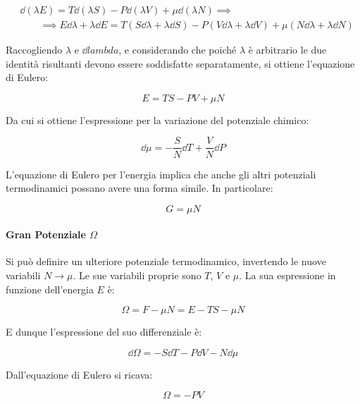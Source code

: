 \begin{align*}
& \dd (\lambda E) = T \dd (\lambda S) - P \dd (\lambda V) + \mu \dd (\lambda N) \implies\\ 
& \qquad \implies E \dd \lambda + \lambda \dd E  = T (S \dd \lambda + \lambda \dd S) - P (V \dd \lambda + \lambda \dd V) + \mu (N\dd \lambda + \lambda \dd N)
\end{align*}

Raccogliendo $\lambda$ e $\dd lambda$, e considerando che poiché $\lambda$ è arbitrario le due identità risultanti devono essere soddisfatte separatamente, si ottiene l'equazione di Eulero:

\begin{equation*}
E = TS - PV + \mu N
\end{equation*}

Da cui si ottiene l'espressione per la variazione del potenziale chimico:

\begin{equation*}
\dd \mu = - \frac{S}{N} \dd T + \frac{V}{N} \dd P
\end{equation*}

L'equazione di Eulero per l'energia implica che anche gli altri potenziali termodinamici possano avere una forma simile. In particolare:

\begin{equation*}
G = \mu N
\end{equation*}

\paragraph{Gran Potenziale $\Omega$} Si può definire un ulteriore potenziale termodinamico, invertendo le nuove variabili $N \rightarrow \mu$. Le sue variabili proprie sono $T$, $V$ e $\mu$. La sua espressione in funzione dell'energia $E$ è:

\begin{equation*}
\Omega = F - \mu N = E - TS - \mu N
\end{equation*}

E dunque l'espressione del suo differenziale è:

\begin{equation*}
\dd \Omega = - S \dd T - P \dd V - N \dd \mu
\end{equation*}

Dall'equazione di Eulero si ricava:

\begin{equation*}
\Omega = - P V
\end{equation*}

